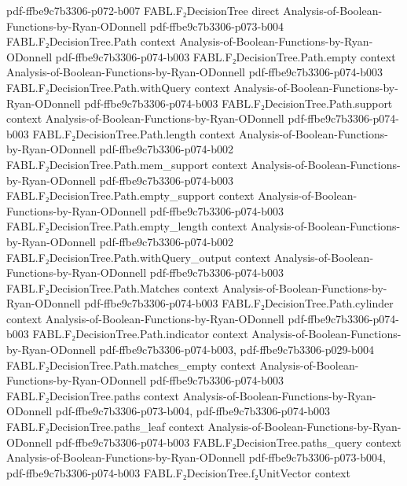 \begin{theorem}
  {pdf-ffbe9c7b3306-p072-b007}
\proofstep
  {FABL.F₂DecisionTree}
  {direct}
  {Analysis-of-Boolean-Functions-by-Ryan-ODonnell}
  {pdf-ffbe9c7b3306-p073-b004}
\proofstep
  {FABL.F₂DecisionTree.Path}
  {context}
  {Analysis-of-Boolean-Functions-by-Ryan-ODonnell}
  {pdf-ffbe9c7b3306-p074-b003}
\proofstep
  {FABL.F₂DecisionTree.Path.empty}
  {context}
  {Analysis-of-Boolean-Functions-by-Ryan-ODonnell}
  {pdf-ffbe9c7b3306-p074-b003}
\proofstep
  {FABL.F₂DecisionTree.Path.withQuery}
  {context}
  {Analysis-of-Boolean-Functions-by-Ryan-ODonnell}
  {pdf-ffbe9c7b3306-p074-b003}
\proofstep
  {FABL.F₂DecisionTree.Path.support}
  {context}
  {Analysis-of-Boolean-Functions-by-Ryan-ODonnell}
  {pdf-ffbe9c7b3306-p074-b003}
\proofstep
  {FABL.F₂DecisionTree.Path.length}
  {context}
  {Analysis-of-Boolean-Functions-by-Ryan-ODonnell}
  {pdf-ffbe9c7b3306-p074-b002}
\proofstep
  {FABL.F₂DecisionTree.Path.mem_support}
  {context}
  {Analysis-of-Boolean-Functions-by-Ryan-ODonnell}
  {pdf-ffbe9c7b3306-p074-b003}
\proofstep
  {FABL.F₂DecisionTree.Path.empty_support}
  {context}
  {Analysis-of-Boolean-Functions-by-Ryan-ODonnell}
  {pdf-ffbe9c7b3306-p074-b003}
\proofstep
  {FABL.F₂DecisionTree.Path.empty_length}
  {context}
  {Analysis-of-Boolean-Functions-by-Ryan-ODonnell}
  {pdf-ffbe9c7b3306-p074-b002}
\proofstep
  {FABL.F₂DecisionTree.Path.withQuery_output}
  {context}
  {Analysis-of-Boolean-Functions-by-Ryan-ODonnell}
  {pdf-ffbe9c7b3306-p074-b003}
\proofstep
  {FABL.F₂DecisionTree.Path.Matches}
  {context}
  {Analysis-of-Boolean-Functions-by-Ryan-ODonnell}
  {pdf-ffbe9c7b3306-p074-b003}
\proofstep
  {FABL.F₂DecisionTree.Path.cylinder}
  {context}
  {Analysis-of-Boolean-Functions-by-Ryan-ODonnell}
  {pdf-ffbe9c7b3306-p074-b003}
\proofstep
  {FABL.F₂DecisionTree.Path.indicator}
  {context}
  {Analysis-of-Boolean-Functions-by-Ryan-ODonnell}
  {pdf-ffbe9c7b3306-p074-b003,
    pdf-ffbe9c7b3306-p029-b004}
\proofstep
  {FABL.F₂DecisionTree.Path.matches_empty}
  {context}
  {Analysis-of-Boolean-Functions-by-Ryan-ODonnell}
  {pdf-ffbe9c7b3306-p074-b003}
\proofstep
  {FABL.F₂DecisionTree.paths}
  {context}
  {Analysis-of-Boolean-Functions-by-Ryan-ODonnell}
  {pdf-ffbe9c7b3306-p073-b004,
    pdf-ffbe9c7b3306-p074-b003}
\proofstep
  {FABL.F₂DecisionTree.paths_leaf}
  {context}
  {Analysis-of-Boolean-Functions-by-Ryan-ODonnell}
  {pdf-ffbe9c7b3306-p074-b003}
\proofstep
  {FABL.F₂DecisionTree.paths_query}
  {context}
  {Analysis-of-Boolean-Functions-by-Ryan-ODonnell}
  {pdf-ffbe9c7b3306-p073-b004,
    pdf-ffbe9c7b3306-p074-b003}
\proofstep
  {FABL.F₂DecisionTree.f₂UnitVector}
  {context}

\end{theorem}
